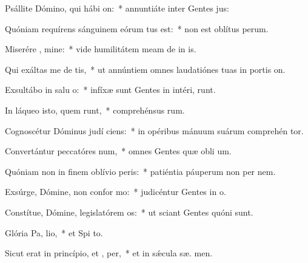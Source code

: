 \item Psállite Dómino, qui hábi  on:~* annuntiáte inter Gentes  jus:
\item Quóniam requírens sánguinem eórum tus est:~* non est oblítus  perum.
\item Miserére , mine:~* vide humilitátem meam de in is.
\item Qui exáltas me de  tis,~* ut annúntiem omnes laudatiónes tuas in portis  on.
\item Exsultábo in salu o:~* infíxæ sunt Gentes in intéri,  runt.
\item In láqueo isto, quem runt,~* comprehénsus   rum.
\item Cognoscétur Dóminus judí ciens:~* in opéribus mánuum suárum comprehén  tor.
\item Convertántur peccatóres  num,~* omnes Gentes quæ obli um.
\item Quóniam non in finem oblívio  peris:~* patiéntia páuperum non per  nem.
\item Exsúrge, Dómine, non confor mo:~* judicéntur Gentes in  o.
\item Constítue, Dómine, legislatórem  os:~* ut sciant Gentes quóni  sunt.
\item Glória Pa,  lio,~* et Spi to.
\item Sicut erat in princípio, et ,  per,~* et in sǽcula sæ. men.
